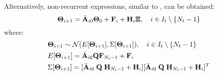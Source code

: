 Alternatively, non-recurrent expressions, similar to , can be obtained:
\[
  \mathbf{\Theta}_{i + 1} = \Bar{\mathbf{A}}_{i0} \mathbf{\Theta}_0 + \mathbf{F}_i + \mathbf{H}_i \mathbf{\Xi}, \hspace{10pt} i \in I_t \setminus \{N_t - 1\}
\]
where:
\begin{align*}
  & \mathbf{\Theta}_{i + 1} \sim \mathcal{N}(E[\mathbf{\Theta}_{i + 1}], \Sigma[\mathbf{\Theta}_{i + 1}]), \hspace{10pt} i \in I_t \setminus \{N_t - 1\} \\
  & E[\mathbf{\Theta}_{i + 1}] = \Bar{\mathbf{A}}_{i0} \mathbf{Q} \mathbf{F}_{N_t - 1} + \mathbf{F}_i \\
  & \Sigma[\mathbf{\Theta}_{i + 1}] = [\Bar{\mathbf{A}}_{i0} \; \mathbf{Q} \; \mathbf{H}_{N_t - 1} + \mathbf{H}_i] [\Bar{\mathbf{A}}_{i0} \; \mathbf{Q} \; \mathbf{H}_{N_t - 1} + \mathbf{H}_i]^T
\end{align*}
